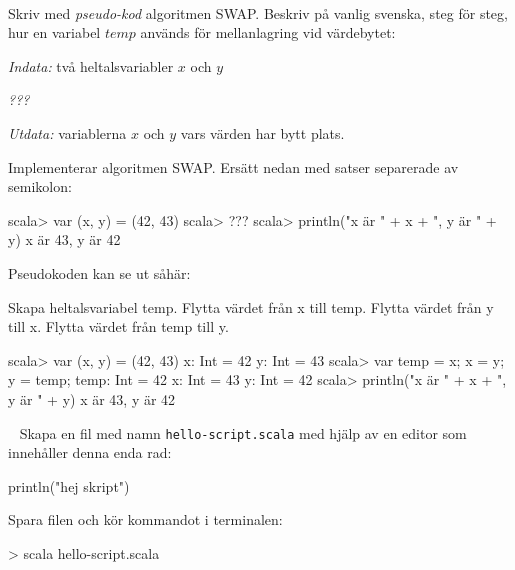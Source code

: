 




\QUESTBEGIN

\Task  \what~ 

\Subtask Skriv med \emph{pseudo-kod} algoritmen SWAP. Beskriv på vanlig svenska, steg för steg, hur en variabel $temp$ används för mellanlagring vid värdebytet:

\emph{Indata:} två heltalsvariabler $x$ och $y$

\emph{???}

\emph{Utdata:} variablerna $x$ och $y$ vars värden har bytt plats.

\Subtask Implementerar algoritmen SWAP. Ersätt  nedan med satser separerade av semikolon:

\begin{REPL}
scala> var (x, y) = (42, 43)
scala> ???
scala> println("x är " + x + ", y är " + y)
x är 43, y är 42
\end{REPL}



\SOLUTION


\TaskSolved \what
 

\SubtaskSolved  Pseudokoden kan se ut såhär:

Skapa heltalsvariabel temp. 
Flytta värdet från x till temp. 
Flytta värdet från y till x. 
Flytta värdet från temp till y.

\SubtaskSolved 
\begin{REPLnonum}
scala> var (x, y) = (42, 43)
x: Int = 42
y: Int = 43
scala> var temp = x; x = y; y = temp;
temp: Int = 42
x: Int = 43
y: Int = 42
scala> println("x är " + x + ", y är " + y)
x är 43, y är 42
\end{REPLnonum}



\QUESTEND









\QUESTBEGIN

\Task  \what~  Skapa en fil med namn \texttt{hello-script.scala} med hjälp av en editor som innehåller denna enda rad:
\begin{Code}
println("hej skript")
\end{Code}
Spara filen och kör kommandot  i terminalen:
\begin{REPLnonum}
> scala hello-script.scala
\end{REPLnonum}

